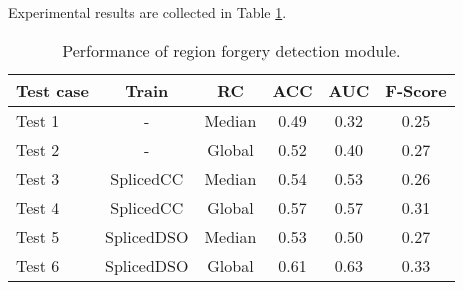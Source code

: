 Experimental results are collected in Table \ref{table:performanceregionaldet}.

\begin{table}[h!]
\centering
\begin{tabular}{l c c c c c} 
\hline \hline 
\textbf{Test case} & \textbf{Train} & \textbf{RC} & \textbf{ACC} & \textbf{AUC} &\textbf{ F-Score} \\ [0.5ex]
\hline
Test 1 & - & Median & 0.49 & 0.32 & 0.25\\
Test 2 & - & Global & 0.52 & 0.40 & 0.27\\
Test 3 & SplicedCC & Median & 0.54 & 0.53 & 0.26\\
Test 4 & SplicedCC & Global & 0.57 & 0.57 & 0.31\\
Test 5 &	 SplicedDSO & Median & 0.53 & 0.50 & 0.27\\
Test 6 &	 SplicedDSO & Global & 0.61 & 0.63 & 0.33\\ [1ex]
\hline
\end{tabular}
\caption{Performance of region forgery detection module.}
\label{table:performanceregionaldet}
\end{table}





